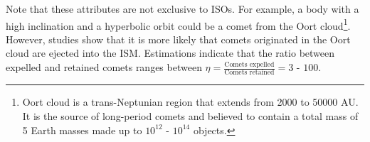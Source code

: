 Note that these attributes are not exclusive to ISOs. For example, a body with a
high inclination and a hyperbolic orbit could be a comet from the Oort
cloud\footnote{ Oort cloud is a trans-Neptunian region that extends from 2000 to
50000 AU. It is the source of long-period comets and believed to contain a total
mass of 5 Earth masses made up to $10^{12}$ - $10^{14}$ objects. }. However,
studies \cite{francis2005} show that it is more likely that comets originated in the Oort cloud are
ejected into the ISM. Estimations indicate that the ratio between expelled and
retained comets ranges between $\eta = \frac{\text{Comets
expelled}}{\text{Comets retained}} = 3 \text{ - } 100$.

